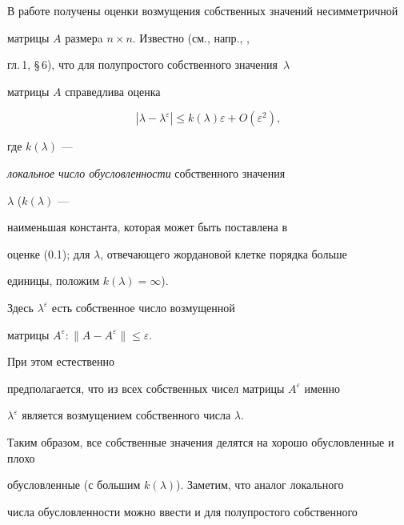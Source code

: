 

\maketitle


\label{begin}








В работе получены оценки возмущения собственных значений несимметричной


матрицы $A$ размерa $n\times n$. Известно (см., напр., \cite{LI},


гл.\,1, \S\,6), что для полупростого собственного значения~$\lambda$


матрицы $A$ справедлива оценка


\begin{equation}


|\lambda-\lambda^{\varepsilon}|\le


k(\lambda)\varepsilon+O(\varepsilon^2), \tag{0.1}


\end{equation}


где $k(\lambda)$ ---


{\it локальное число обусловленности} собственного значения


$\lambda$ ($k(\lambda)$ ---


наименьшая константа, которая может быть поставлена в


оценке (0.1); для $\lambda$, отвечающего жордановой клетке порядка больше


единицы, положим $k(\lambda)=


\infty$).


Здесь $\lambda^{\varepsilon}$ есть собственное число возмущенной


матрицы $A^{\varepsilon}: \|A-A^{\varepsilon}\|\le \varepsilon$.


При этом естественно


предполагается, что из всех собственных чисел матрицы $A^{\varepsilon}$ именно


$\lambda^{\varepsilon}$ является возмущением собственного числа $\lambda$.


Таким образом, все собственные значения делятся на хорошо обусловленные и плохо


обусловленные (с большим $k(\lambda)$). Заметим, что аналог локального


числа обусловленности можно ввести и для полупростого собственного


